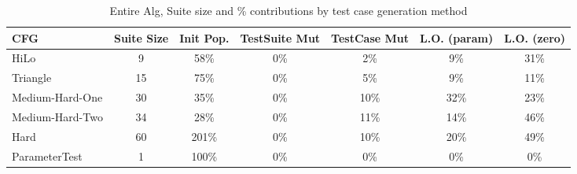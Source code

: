 \documentclass[runningheads]{llncs}
\begin{document}
\begin{table}[h!]
	\begin{center}
		\begin{tabular}{| l | c || c | c | c | c | c |}
			\hline
			CFG             & Suite Size & Init Pop. & TestSuite Mut & TestCase Mut & L.O. (param) & L.O. (zero) \\ \hline
			HiLo            & 9          & 58\%      & 0\%           & 2\%          & 9\%          & 31\%        \\ \hline
			Triangle        & 15         & 75\%      & 0\%           & 5\%          & 9\%          & 11\%        \\ \hline
			Medium-Hard-One & 30         & 35\%      & 0\%           & 10\%         & 32\%         & 23\%        \\ \hline
			Medium-Hard-Two & 34         & 28\%      & 0\%           & 11\%         & 14\%         & 46\%        \\ \hline
			Hard            & 60         & 201\%     & 0\%           & 10\%         & 20\%         & 49\%        \\ \hline
			ParameterTest   & 1          & 100\%     & 0\%           & 0\%          & 0\%          & 0\%         \\ \hline
		\end{tabular}
	\end{center}
	\caption{Entire Alg, Suite size and \% contributions by test case generation method}
	\label{tab:ContrAll}
\end{table}
\end{document}
